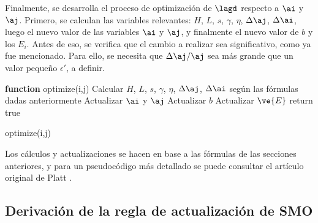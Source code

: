 Finalmente, se desarrolla el proceso de optimización de $\lagd$ respecto a $\ai$ y $\aj$. Primero, se calculan las variables relevantes: $H$, $L$, $s$, $\gamma$, $\eta$, $\Delta \aj$, $\Delta \ai$, luego el nuevo valor de las variables $\ai$ y $\aj$, y finalmente el nuevo valor de $b$ y los $E_i$. Antes de eso, se verifica que el cambio a realizar sea significativo, como ya fue mencionado. Para ello, se necesita que $\Delta \aj / \aj$ sea más grande que un valor pequeño $\epsilon'$, a definir.


\begin{function}[H]
\textbf{function} optimize(i,j) \;
	Calcular $H$, $L$, $s$, $\gamma$, $\eta$, $\Delta \aj$, $\Delta \ai$ según las fórmulas dadas anteriormente \;
	Actualizar $\ai$ y $\aj$ \;
	Actualizar $b$ \;
	Actualizar $\ve{E}$ \;
	return true \;
\caption{optimize(i,j) } 
\end{function}
\vspace{10pt}


Los cálculos y actualizaciones se hacen en base a las fórmulas de las secciones anteriores, y para un pseudocódigo más detallado se puede consultar el artículo original de Platt \cite{platt1998}.

\subsection{Derivación de la regla de actualización de SMO}
\label{sec:smoregla}